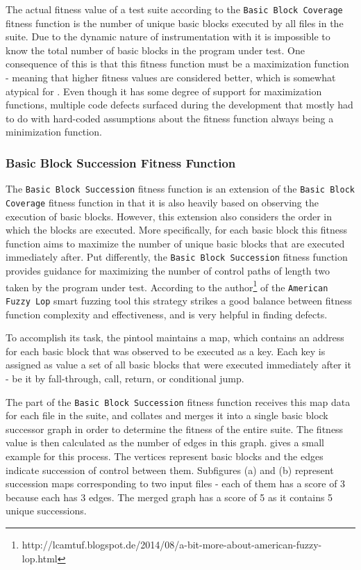 The actual fitness value of a test suite according to the \texttt{Basic Block Coverage} fitness function 
is the number of unique basic blocks executed by all \xml files in the suite. Due to the dynamic nature 
of instrumentation with \pin it is impossible to know the total number of basic blocks in the program 
under test. One consequence of this is that this fitness function must be a maximization function - meaning
that higher fitness values are considered better, which is somewhat atypical for \evosuite. Even though it has
some degree of support for maximization functions, multiple code defects surfaced during the development that
mostly had to do with hard-coded assumptions about the fitness function always being a minimization function.

\subsubsection{Basic Block Succession Fitness Function}
The \texttt{Basic Block Succession} fitness function is an extension of the \texttt{Basic Block Coverage}
fitness function in that it is also heavily based on observing the execution of basic blocks. However, this
extension also considers the order in which the blocks are executed. More specifically, for each basic block
this fitness function aims to maximize the number of unique basic blocks that are executed immediately after.
Put differently, the \texttt{Basic Block Succession} fitness function provides guidance for maximizing the
number of control paths of length two taken by the program under test. According to the
author\footnote{http://lcamtuf.blogspot.de/2014/08/a-bit-more-about-american-fuzzy-lop.html} of the
\texttt{American Fuzzy Lop} smart fuzzing tool\cite{afl} this strategy strikes a good balance between
fitness function complexity and effectiveness, and is very helpful in finding defects.

To accomplish its task, the pintool maintains a map, which contains an address for each basic block that was
observed to be executed as a key. Each key is assigned as value a set of all basic blocks that were executed
immediately after it - be it by fall-through, call, return, or conditional jump. 

The \java part of the \texttt{Basic Block Succession} fitness function receives this map data for each file in
the suite, and collates and merges it into a single basic block successor graph in order to determine the
fitness of the entire suite. The fitness value is then calculated as the number of edges in this graph. 
 gives a small example for this process. The vertices represent basic blocks and the edges
indicate succession of control between them. Subfigures (a) and (b) represent succession maps corresponding to
two input files - each of them has a score of 3 because each has 3 edges. The merged graph has a score of 5 as
it contains 5 unique successions.

